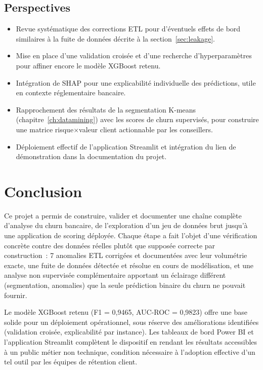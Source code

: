 \documentclass[11pt,a4paper]{report}
\begin{document}
\section{Perspectives}

\begin{itemize}
\item Revue syst\'ematique des corrections ETL pour d'\'eventuels effets de
      bord similaires \`a la fuite de donn\'ees d\'ecrite \`a la
      section~\ref{sec:leakage}.
\item Mise en place d'une validation crois\'ee et d'une recherche
      d'hyperparam\`etres pour affiner encore le mod\`ele XGBoost retenu.
\item Int\'egration de SHAP pour une explicabilit\'e individuelle des
      pr\'edictions, utile en contexte r\'eglementaire bancaire.
\item Rapprochement des r\'esultats de la segmentation K-means
      (chapitre~\ref{ch:datamining}) avec les scores de churn supervis\'es,
      pour construire une matrice risque$\times$valeur client actionnable par
      les conseillers.
\item D\'eploiement effectif de l'application Streamlit et int\'egration du
      lien de d\'emonstration dans la documentation du projet.
\end{itemize}

\chapter{Conclusion}
\label{ch:conclusion}

Ce projet a permis de construire, valider et documenter une cha\^ine compl\`ete
d'analyse du churn bancaire, de l'exploration d'un jeu de donn\'ees brut
jusqu'\`a une application de scoring d\'eploy\'ee. Chaque \'etape a fait l'objet
d'une v\'erification concr\`ete contre des donn\'ees r\'eelles plut\^ot que
suppos\'ee correcte par construction~: 7 anomalies ETL corrig\'ees et
document\'ees avec leur volum\'etrie exacte, une fuite de donn\'ees d\'etect\'ee et
r\'esolue en cours de mod\'elisation, et une analyse non supervis\'ee compl\'ementaire
apportant un \'eclairage diff\'erent (segmentation, anomalies) que la seule
pr\'ediction binaire du churn ne pouvait fournir.

Le mod\`ele XGBoost retenu (F1 = 0,9465, AUC-ROC = 0,9823) offre une base
solide pour un d\'eploiement op\'erationnel, sous r\'eserve des am\'eliorations
identifi\'ees (validation crois\'ee, explicabilit\'e par instance). Les tableaux
de bord Power BI et l'application Streamlit compl\`etent le dispositif en
rendant les r\'esultats accessibles \`a un public m\'etier non technique, condition
n\'ecessaire \`a l'adoption effective d'un tel outil par les \'equipes de
r\'etention client.
\end{document}
